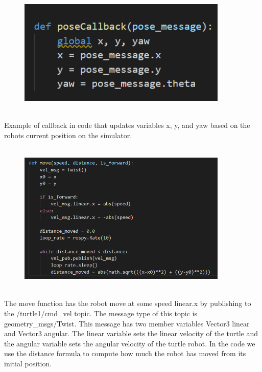 \documentclass{article}
\begin{document}
\begin{figure}[htp]
    \includegraphics[width=10cm]{callback.png}
    \label{fig:callback}
\end{figure} \\
Example of callback in code that updates variables x, y, and yaw based on the robots current position on the simulator.\\\\
\newpage 

\begin{figure}[htp]
    \includegraphics[width=10cm]{move.png}
    \label{fig:move}
\end{figure} \\
The move function has the robot move at some speed linear.x by publishing to the /turtle1/cmd\_vel topic. The message type of this topic is geometry\_msgs/Twist. This message has two member variables Vector3 linear and Vector3 angular. The linear variable sets the linear velocity of the turtle and the angular variable sets the angular velocity of the turtle robot. In the code we use the distance formula to compute how much the robot has moved from its initial position.\\\\
\end{document}
